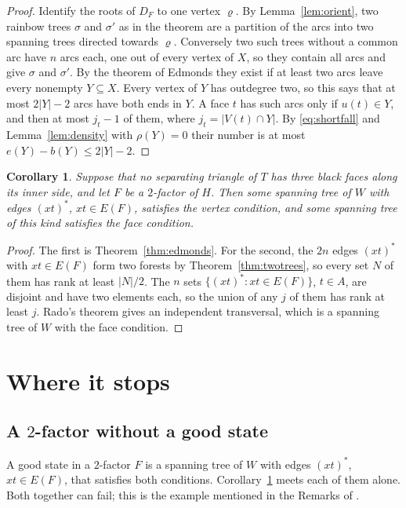 \documentclass[10pt]{amsart}
\numberwithin{equation}{section}
\newtheorem{corollary}[equation]{Corollary}
\theoremstyle{definition}
\theoremstyle{remark}
\begin{document}
\begin{proof}
Identify the roots of $D_F$ to one vertex $\varrho$.
By Lemma~\ref{lem:orient}, two rainbow trees $\sigma$ and $\sigma'$ as in the theorem are a partition of the arcs into two spanning trees directed towards $\varrho$.
Conversely two such trees without a common arc have $n$ arcs each, one out of every vertex of $X$, so they contain all arcs and give $\sigma$ and $\sigma'$.
By the theorem of Edmonds they exist if at least two arcs leave every nonempty $Y\subseteq X$.
Every vertex of $Y$ has outdegree two, so this says that at most $2|Y|-2$ arcs have both ends in $Y$.
A face $t$ has such arcs only if $u(t)\in Y$, and then at most $j_t-1$ of them, where $j_t=|V(t)\cap Y|$.
By \eqref{eq:shortfall} and Lemma~\ref{lem:density} with $\rho(Y)=0$ their number is at most $e(Y)-b(Y)\le2|Y|-2$.
\end{proof}

\begin{corollary}\label{cor:alone}
Suppose that no separating triangle of $T$ has three black faces along its inner side, and let $F$ be a $2$-factor of $H$.
Then some spanning tree of $W$ with edges $(xt)^*$, $xt\in E(F)$, satisfies the vertex condition, and some spanning tree of this kind satisfies the face condition.
\end{corollary}

\begin{proof}
The first is Theorem~\ref{thm:edmonds}.
For the second, the $2n$ edges $(xt)^*$ with $xt\in E(F)$ form two forests by Theorem~\ref{thm:twotrees}, so every set $N$ of them has rank at least $|N|/2$.
The $n$ sets $\{(xt)^*:xt\in E(F)\}$, $t\in A$, are disjoint and have two elements each, so the union of any $j$ of them has rank at least $j$.
Rado's theorem gives an independent transversal, which is a spanning tree of $W$ with the face condition.
\end{proof}

\section{Where it stops}\label{sec:wall}

\subsection*{A \texorpdfstring{$2$}{2}-factor without a good state}
A good state in a $2$-factor $F$ is a spanning tree of $W$ with edges $(xt)^*$, $xt\in E(F)$, that satisfies both conditions.
Corollary~\ref{cor:alone} meets each of them alone.
Both together can fail; this is the example mentioned in the Remarks of \cite{Paper}.
\end{document}
